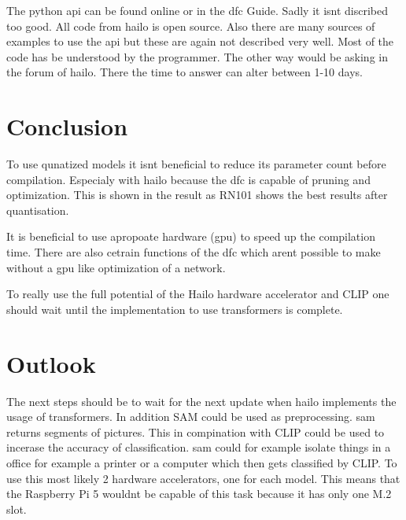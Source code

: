 The python \acrfull{api} can be found online or in the \acrshort{dfc} Guide.
Sadly it isnt discribed too good.
All code from hailo is open source.
Also there are many sources of examples to use the \acrshort{api} but these are again not described very well.
Most of the code has be understood by the programmer.
The other way would be asking in the forum of hailo.
There the time to answer can alter between 1-10 days.



\section{Conclusion}

To use qunatized models it isnt beneficial to reduce its parameter count before compilation.
Especialy with hailo because the \acrshort{dfc} is capable of pruning and optimization.
This is shown in the result as RN101 shows the best results after quantisation.

It is beneficial to use apropoate hardware (\acrshort{gpu}) to speed up the compilation time.
There are also cetrain functions of the \acrshort{dfc} which arent possible to make without a \acrshort{gpu} like optimization of a network.

To really use the full potential of the Hailo hardware accelerator and CLIP one should wait until the implementation to use transformers is complete. 

\section{Outlook}

The next steps should be to wait for the next update when hailo implements the usage of transformers.
In addition SAM\cite{sam} could be used as preprocessing.
\acrshort{sam} returns segments of pictures.
This in compination with CLIP could be used to incerase the accuracy of classification.
\acrshort{sam} could for example isolate things in a office for example a printer or a computer which then gets classified by CLIP.
To use this most likely 2 hardware accelerators, one for each model.
This means that the Raspberry Pi 5 wouldnt be capable of this task because it has only one M.2 slot.

